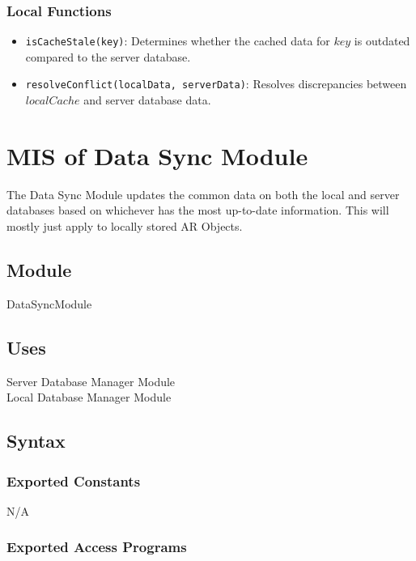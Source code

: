 \documentclass[12pt, titlepage]{article}
\begin{document}
\subsubsection{Local Functions}

\begin{itemize}
  \item \texttt{isCacheStale(key)}: Determines whether the cached data for \( key \) is outdated compared to the server database.
  \item \texttt{resolveConflict(localData, serverData)}: Resolves discrepancies between \( localCache \) and server database data.
\end{itemize}

\newpage

\section{MIS of Data Sync Module} \label{DataSync} 

The Data Sync Module updates the common data on both the local and server databases based on whichever has the most up-to-date information. This will mostly just apply to locally stored AR Objects.

\subsection{Module}

DataSyncModule

\subsection{Uses}

Server Database Manager Module\\
Local Database Manager Module

\subsection{Syntax}

\subsubsection{Exported Constants}

N/A

\subsubsection{Exported Access Programs}
\end{document}

